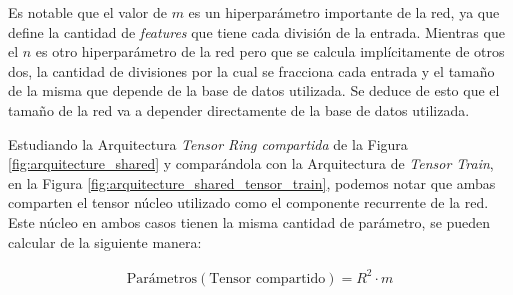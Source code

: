 \documentclass[spanish]{article}
\theoremstyle{definition}
\theoremstyle{remark}
\numberwithin{equation}{section}
\numberwithin{equation}{section} %
\begin{document}
Es notable que el valor de $m$ es un hiperparámetro importante de la red, ya que define la cantidad de \textit{features} que tiene cada división de la entrada. Mientras que el $n$ es otro hiperparámetro de la red pero que se calcula implícitamente de otros dos, la cantidad de divisiones por la cual se fracciona cada entrada y el tamaño de la misma que depende de la base de datos utilizada. Se deduce de esto que el tamaño de la red va a depender directamente de la base de datos utilizada. 
\par
Estudiando la Arquitectura \textit{Tensor Ring compartida} de la Figura \ref{fig:arquitecture_shared} y comparándola con la Arquitectura de \textit{Tensor Train}, en la Figura \ref{fig:arquitecture_shared_tensor_train}, podemos notar que ambas comparten el tensor núcleo utilizado como el componente recurrente de la red. Este núcleo en ambos casos tienen la misma cantidad de parámetro, se pueden calcular de la siguiente manera: 

 \begin{equation}
\label{shared_tensor_parameters}
\begin{gathered}
\text{Parámetros}(\text{Tensor compartido})= R^{2} \cdot m 
\end{gathered}
\end{equation} \par
 
\end{document}
